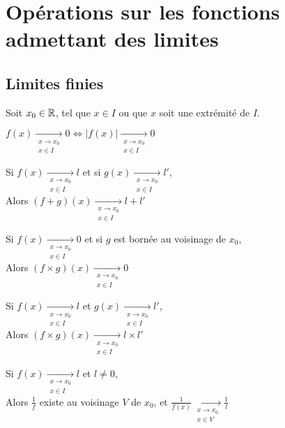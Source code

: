 \documentclass[12pt,twoside,a4paper]{article}
\author{MPSI 2}
\begin{document}
	\maketitle
	\section{Op\'erations sur les fonctions admettant des limites}
		\subsection{Limites finies}
			Soit $x_0\in\mathbb{R}$, tel que $x\in I$ ou que $x$ soit une extr\'emit\'e de $I$.
			\begin{liste}
				\item $f(x)\mathop{\longrightarrow}\limits_{\substack{x\rightarrow x_0\\x\in I}}0\iff|f(x)|\mathop{\longrightarrow}\limits_{\substack{x\rightarrow x_0\\x\in I}}0$\\
				
				\item Si $f(x)\mathop{\longrightarrow}\limits_{\substack{x\rightarrow x_0\\x\in I}}l$ et si $g(x)\mathop{\longrightarrow}\limits_{\substack{x\rightarrow x_0\\x\in I}}l'$,\\
					Alors $(f+g)(x)\mathop{\longrightarrow}\limits_{\substack{x\rightarrow x_0\\x\in I}}l+l'$\\
				\item Si $f(x)\mathop{\longrightarrow}\limits_{\substack{x\rightarrow x_0\\x\in I}}0$ et si $g$ est born\'ee au voisinage de $x_0$,\\
					Alors $(f\times g)(x)\mathop{\longrightarrow}\limits_{\substack{x\rightarrow x_0\\x\in I}}0$\\
				\item Si $f(x)\mathop{\longrightarrow}\limits_{\substack{x\rightarrow x_0\\x\in I}}l$ et $g(x)\mathop{\longrightarrow}\limits_{\substack{x\rightarrow x_0\\x\in I}}l'$,\\
					Alors $(f\times g)(x)\mathop{\longrightarrow}\limits_{\substack{x\rightarrow x_0\\x\in I}}l\times l'$\\
				\item Si $f(x)\mathop{\longrightarrow}\limits_{\substack{x\rightarrow x_0\\x\in I}}l$ et $l\neq0$,\\
					Alors $\frac1{f}$ existe au voisinage $V$ de $x_0$, et $\frac1{f(x)}\mathop{\longrightarrow}\limits_{\substack{x\rightarrow x_0\\x\in V}}\frac1l$
			\end{liste}
\end{document}
